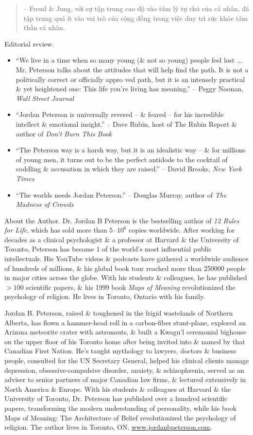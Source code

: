 \documentclass{article}
\begin{document}
\begin{enumerate}
\begin{quotation}
		-- {\sc Freud} \& {\sc Jung}, với sự tập trung cao độ vào tâm lý tự chủ của cá nhân, đã tập trung quá ít vào vai trò của cộng đồng trong việc duy trì sức khỏe tâm thần cá nhân.
	\end{quotation}
	{\sf Editorial review.}
	\begin{itemize}
		\item ``We live in a time when so many young (\& not so young) people feel lost $\ldots$ Mr. {\sc Peterson} talks about the attitudes that will help find the path. It is not a politically correct or officially appro ved path, but it is an intensely practical \& yet heightened one: This life you're living has meaning.'' -- {\sc Peggy Noonan}, {\it Wall Street Journal}
		\item ``{\sc Jordan Peterson} is universally revered -- \& feared -- for his incredible intellect \& emotional insight.'' -- {\sc Dave Rubin}, host of The Rubin Report \& author of {\it Don't Burn This Book}
		\item ``The Peterson way is a harsh way, but it is an idealistic way -- \& for millions of young men, it turns out to be the perfect antidode to the cocktail of coddling \& accusation in which they are raised.'' -- {\sc David Brooks}, {\it New York Times}
		\item ``The worlds needs {\sc Jordan Peterson}.'' -- {\sc Douglas Murray}, author of {\it The Madness of Crowds}
	\end{itemize}
	{\sf About the Author.} Dr. {\sc Jordan B Peterson} is the bestselling author of {\it12 Rules for Life}, which has sold more than $5\cdot10^6$ copies worldwide. After working for decades as a clinical psychologist \& a professor at Harvard \& the University of Toronto, Peterson has become 1 of the world's most influential public intellectuals. His YouTube videos \& podcasts have gathered a worldwide audience of hundreds of millions, \& his global book tour reached more than 250000 people in major cities across the globe. With his students \& colleagues, he has published $> 100$ scientific papers, \& his 1999 book {\it Maps of Meaning} revolutionized the psychology of religion. He lives in Toronto, Ontario with his family.

	{\sc Jordan B. Peterson}, raised \& toughened in the frigid wastelands of Northern Alberta, has flown a hammer-head roll in a carbon-fiber stunt-plane, explored an Arizona meteorite crater with astronauts, \& built a Kwagu'l ceremonial bighouse on the upper floor of his Toronto home after being invited into \& named by that Canadian First Nation. He's taught mythology to lawyers, doctors \& business people, consulted for the UN Secretary General, helped his clinical clients manage depression, obsessive-compulsive disorder, anxiety, \& schizophrenia, served as an adviser to senior partners of major Canadian law firms, \& lectured extensively in North America \& Europe. With his students \& colleagues at Harvard \& the University of Toronto, Dr. Peterson has published over a hundred scientific papers, transforming the modern understanding of personality, while his book Maps of Meaning: The Architecture of Belief revolutionized the psychology of religion. The author lives in Toronto, ON. \url{www.jordanbpeterson.com}.


\end{enumerate}
\end{document}
